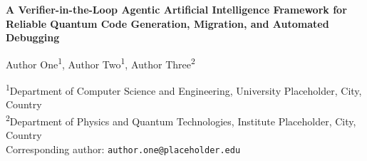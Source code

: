 \documentclass[11pt,a4paper]{article}
\begin{document}
\begin{center}
{\LARGE\bfseries A Verifier-in-the-Loop Agentic Artificial Intelligence Framework for Reliable Quantum Code Generation, Migration, and Automated Debugging\par}
\vspace{1.2em}
{\large Author One\textsuperscript{1}, Author Two\textsuperscript{1}, Author Three\textsuperscript{2}\par}
\vspace{0.6em}
{\small \textsuperscript{1}Department of Computer Science and Engineering, University Placeholder, City, Country\\
\textsuperscript{2}Department of Physics and Quantum Technologies, Institute Placeholder, City, Country\\
Corresponding author: \texttt{author.one@placeholder.edu}\par}
\end{center}
\vspace{0.8em}
\end{document}
